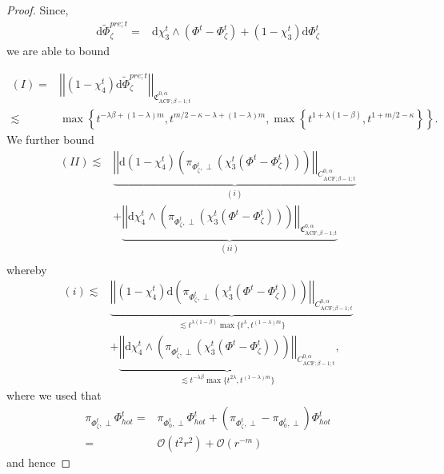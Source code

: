 \documentclass[psamsfonts]{amsart}
\theoremstyle{plain}
\theoremstyle{definition}{
\newtheorem{defi}{Definition}[section]
\newtheorem{ass}{Assumption}
\newtheorem*{nota}{Notation}}
\theoremstyle{remark}{
\newtheorem{rem}{Remark}
\newtheorem{ex}{Example}}
\theoremstyle{plain}{
\newtheorem{thm}{Theorem}[section]
\newtheorem{lem}{Lemma}[section]
\newtheorem{cor}{Corollary}[section]
\newtheorem{prop}{Proposition}[section]
\newtheorem{con}{Conjecture}[section]}
\newcommand{\m}[1]{{\mathrm{#1}}}
\begin{document}
\begin{proof}
Since,
\begin{align*}
        \m{d}\widetilde{\Phi}^{pre;t}_{\zeta}=&\m{d}\chi^t_3\wedge(\Phi^t-\Phi^t_\zeta)+(1-\chi^t_3)\m{d}\Phi^t_{\zeta}
\end{align*}
we are able to bound

\begin{align*}
    (I)=&\left|\left|(1-\chi^t_4)\m{d}\widetilde{\Phi}^{pre;t}_{\zeta}\right|\right|_{\mathfrak{C}^{0,\alpha}_{\m{ACF};\beta-1;t}}\\
    \lesssim&\max\left\{t^{-\lambda\beta+(1-\lambda)m},t^{m/2-\kappa-\lambda+(1-\lambda)m},\max\left\{t^{1+\lambda(1-\beta)},t^{1+m/2-\kappa}\right\}\right\}.
\end{align*}
We further bound 
\begin{align*}
    (II)\lesssim&\underbrace{\left|\left|\m{d}(1-\chi^t_4)\left(\pi_{\Phi^t_\zeta,\perp}\left(\chi^t_3(\Phi^t-\Phi^t_\zeta)\right)\right)\right|\right|_{C^{0,\alpha}_{\m{ACF};\beta-1;t}}}_{(i)}\\
    &+\underbrace{\left|\left|\m{d}\chi^t_4\wedge\left(\pi_{\Phi^t_\zeta,\perp}\left(\chi^t_3(\Phi^t-\Phi^t_\zeta)\right)\right)\right|\right|_{\mathfrak{C}^{0,\alpha}_{\m{ACF};\beta-1;t}}}_{(ii)}\\
\end{align*}
whereby 
\begin{align*}
    (i)\lesssim&\underbrace{\left|\left|(1-\chi^t_4)\m{d}\left(\pi_{\Phi^t_\zeta,\perp}\left(\chi^t_3(\Phi^t-\Phi^t_\zeta)\right)\right)\right|\right|_{C^{0,\alpha}_{\m{ACF};\beta-1;t}}}_{\lesssim t^{\lambda(1-\beta)}\max\{t^\lambda,t^{(1-\lambda)m}\}}\\
    &+\underbrace{\left|\left|\m{d}\chi^t_4\wedge\left(\pi_{\Phi^t_\zeta,\perp}\left(\chi^t_3(\Phi^t-\Phi^t_\zeta)\right)\right)\right|\right|_{C^{0,\alpha}_{\m{ACF};\beta-1;t}}}_{\lesssim t^{-\lambda\beta}\max\{t^{2\lambda},t^{(1-\lambda)m}\}},
\end{align*}
where we used that 
\begin{align*}
    \pi_{\Phi^t_\zeta,\perp}\Phi^t_{hot}=&\pi_{\Phi^t_0,\perp}\Phi^t_{hot}+(\pi_{\Phi^t_\zeta,\perp}-\pi_{\Phi^t_0,\perp})\Phi^t_{hot}\\
    =&\mathcal{O}(t^2r^2)+\mathcal{O}(r^{-m})
\end{align*}
and hence 


\end{proof}
\end{document}
